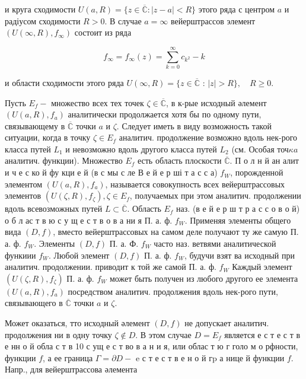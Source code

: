 \documentclass[10pt]{article}
\begin{document}
и круга сходимости $U(a, R)=\{z \in \overline{\mathbb{C}}:|z-a|<R\}$ этого ряда с центром $a$ и радіусом сходимости $R>0$. В случае $a=\infty$ вейерштрассов элемент $\left(U(\infty, R), f_{\infty}\right)$ состоит из ряда



\[

f_{\infty}=f_{\infty}(z)=\sum_{k=0}^{\infty} c_{k^{2}}-k

\]



и области сходимости этого ряда $U(\infty, R)=\{z \in \overline{\mathbb{C}}$ : $|z|>R\}, \quad R \geqslant 0$.



Пусть $E_{f}-$ множество всех тех точек $\zeta \in \overline{\mathbb{C}}$, в к-рые исходный әлемент $\left(U(a, R), f_{a}\right)$ аналитически продолжается хотя бы по одному пути, связывающему в $\overline{\mathbb{C}}$ точки $a$ и $\zeta$. Следует иметь в виду возможность такой ситуации, когда в точку $\zeta \in E_{f}$ аналитич. продолжение возможно вдоль нек-рого класса путей $L_{1}$ и невозможно вдоль другого класса путей $L_{2}$ (см. Особая точ$\kappa a$ аналитич. функции). Множество $E_{f}$ есть область плоскости $\overline{\mathbb{C}}$. П о л н й ан алит и ч е с ко й фу кци е й (в с мы с ле В е й е р ші т а с с а) $f_{W}$, порожденной элементом $\left(U(a, R), f_{a}\right)$, называется совокупность всех вейерштрассовых элементов $\left(U(\zeta, R), f_{\zeta}\right), \zeta \in E_{f}$, получаемых при этом аналитич. продолжении вдоль всевозможных путей $L \subset \overline{\mathbb{C}}$. Область $E_{f}$ наз. (в е й е р ш т р а с с о в о й) о б л ас т в ю с у щ е с т в о в а ни я П. а. ф. $f_{W}$. Применяя элементы общего вида $(D, f)$, вместо вейерштрассовых на самом деле получают ту же самую П. а. ф. $f_{W}$. Элементы $(D, f)$ П. а. Ф. $f_{W}$ часто наз. ветвями аналитической функиии $f_{W}$. Любой элемент $(D, f)$ П. а. ф. $f_{W}$, будучи взят ва исходный при аналитич. продолжении. приводит к той же самой П. а. ф. $f_{W}$ Каждый элемент $\left(U(\zeta, R), f_{\zeta}\right)$ П. а. ф. $f_{W}$ может быть получен из любого другого ее элемента $\left(U(a, R), f_{a}\right)$ посредством аналитич. продолжения вдоль нек-рого пути, связывающего в $\overline{\mathbb{C}}$ точки $a$ и $\zeta$.



Может оказаться, тто исходный әлемент $(D, f)$ не допускает аналитич. продолжения ни в одну точку $\zeta \notin D$. В этом случае $D=E_{f}$ является е с т е с т в е нн о й обла с т в 10 с ущ е с т во в а н и я, или облас т ю г голо м о рфности, функции $f$, а ее граница $\Gamma=\partial D-$ e с т е с т в е н о й $г \mathrm{p}$ а нице й функции $f$. Напр., для вейерштрассова әлемента
\end{document}
